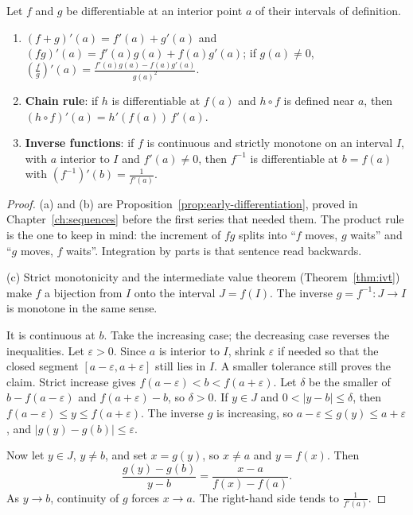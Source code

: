 \begin{propositionx}
Let $f$ and $g$ be differentiable at an interior point $a$ of their intervals of definition.
\begin{enumerate}[label=(\alph*)]
\item $(f+g)'(a)=f'(a)+g'(a)$ and $(fg)'(a)=f'(a)g(a)+f(a)g'(a)$; if $g(a)\ne0$, $\left(\frac fg\right)'(a)=\frac{f'(a)g(a)-f(a)g'(a)}{g(a)^2}$.
\item \textbf{Chain rule}: if $h$ is differentiable at $f(a)$ and $h\circ f$ is defined near $a$, then $(h\circ f)'(a)=h'(f(a))\,f'(a)$.
\item \textbf{Inverse functions}: if $f$ is continuous and strictly monotone on an interval $I$, with $a$ interior to $I$ and $f'(a)\ne0$, then $f^{-1}$ is differentiable at $b=f(a)$ with $(f^{-1})'(b)=\frac1{f'(a)}$.
\end{enumerate}
\end{propositionx}
\begin{proof}
(a) and (b) are Proposition~\ref{prop:early-differentiation}, proved in Chapter~\ref{ch:sequences} before the first series that needed them. The product rule is the one to keep in mind: the increment of $fg$ splits into ``$f$ moves, $g$ waits'' and ``$g$ moves, $f$ waits''. Integration by parts is that sentence read backwards.

(c) Strict monotonicity and the intermediate value theorem (Theorem~\ref{thm:ivt}) make $f$ a bijection from $I$ onto the interval $J=f(I)$. The inverse $g=f^{-1}:J\to I$ is monotone in the same sense.

It is continuous at $b$. Take the increasing case; the decreasing case reverses the inequalities. Let $\varepsilon>0$. Since $a$ is interior to $I$, shrink $\varepsilon$ if needed so that the closed segment $[a-\varepsilon,a+\varepsilon]$ still lies in $I$. A smaller tolerance still proves the claim. Strict increase gives $f(a-\varepsilon)<b<f(a+\varepsilon)$. Let $\delta$ be the smaller of $b-f(a-\varepsilon)$ and $f(a+\varepsilon)-b$, so $\delta>0$. If $y\in J$ and $0<|y-b|\le\delta$, then $f(a-\varepsilon)\le y\le f(a+\varepsilon)$. The inverse $g$ is increasing, so $a-\varepsilon\le g(y)\le a+\varepsilon$, and $|g(y)-g(b)|\le\varepsilon$.

Now let $y\in J$, $y\ne b$, and set $x=g(y)$, so $x\ne a$ and $y=f(x)$. Then
\[
\frac{g(y)-g(b)}{y-b}=\frac{x-a}{f(x)-f(a)}.
\]
As $y\to b$, continuity of $g$ forces $x\to a$. The right-hand side tends to $\frac1{f'(a)}$.
\end{proof}

